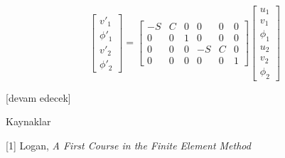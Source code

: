 \documentclass[12pt,fleqn]{article}\usepackage{../../common}
\begin{document}
$$
\left[\begin{array}{c}
v'_1 \\ \phi'_1 \\ v'_2 \\ \phi'_2
\end{array}\right] =
\left[\begin{array}{cccccc}
-S & C & 0 & 0 & 0 & 0 \\
0 & 0 & 1 & 0 & 0 & 0 \\
0 & 0 & 0 & -S & C & 0 \\
0 & 0 & 0 & 0 & 0 & 1
\end{array}\right]
\left[\begin{array}{c}
u_1 \\ v_1 \\ \phi_1 \\ u_2 \\ v_2 \\ \phi_2
\end{array}\right]
$$








[devam edecek]

Kaynaklar

[1] Logan, {\em A First Course in the Finite Element Method}
\end{document}
